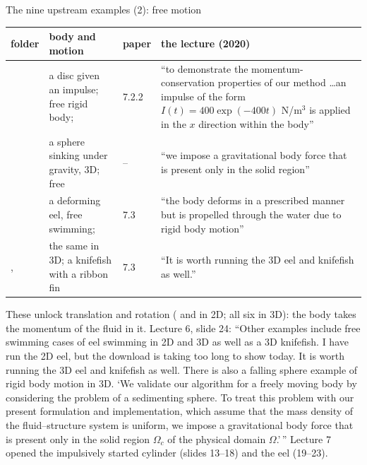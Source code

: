 \documentclass[aspectratio=169,11pt]{beamer}
\begin{document}
\begin{frame}{The nine upstream examples (2): free motion}
\label{fr:nine2}
\scriptsize
\setlength{\tabcolsep}{3pt}
\begin{tabular}{@{}L{0.29\textwidth}L{0.2\textwidth}lL{0.38\textwidth}@{}}
\toprule
folder & body and motion & paper & the lecture (2020) \\
\midrule
{} & a disc given an impulse; free rigid body;  & 7.2.2 & ``to demonstrate the momentum-conservation properties of our method \ldots an impulse of the form $I(t) = 400\exp(-400t)$ N/m$^3$ is applied in the $x$ direction within the body''\\
 & a sphere sinking under gravity, 3D; free & -- & ``we impose a gravitational body force that is present only in the solid region''\\
 & a deforming eel, free swimming;  & 7.3 & ``the body deforms in a prescribed manner but is propelled through the water due to rigid body motion''\\
,  & the same in 3D; a knifefish with a ribbon fin & 7.3 & ``It is worth running the 3D eel and knifefish as well.''\\
\bottomrule
\end{tabular}
\vspace{1mm}

\scriptsize These unlock translation and rotation ( and  in 2D; all six in 3D): the body takes the momentum of the fluid in it. Lecture 6, slide 24: ``Other examples include free swimming cases of eel swimming in 2D and 3D as well as a 3D knifefish. I have run the 2D eel, but the download is taking too long to show today. It is worth running the 3D eel and knifefish as well. There is also a falling sphere example of rigid body motion in 3D. `We validate our algorithm for a freely moving body by considering the problem of a sedimenting sphere. To treat this problem with our present formulation and implementation, which assume that the mass density of the fluid--structure system is uniform, we impose a gravitational body force that is present only in the solid region $\Omega_c$ of the physical domain $\Omega$.'\,'' Lecture 7 opened the impulsively started cylinder (slides 13--18) and the eel (19--23).
\end{frame}
\end{document}
